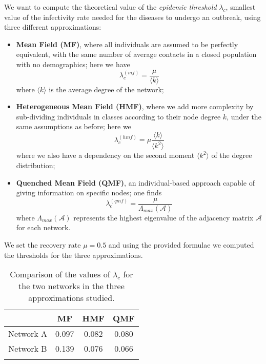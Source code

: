 \documentclass[a4paper,11pt]{article}
\begin{document}
We want to compute the theoretical value of the \emph{epidemic threshold} $\lambda_c$, smallest value of the infectivity rate needed for the diseases to undergo an outbreak, using three different approximations:
\begin{itemize}

    \item \textbf{Mean Field (MF)}, 
    where all individuals are assumed to be perfectly equivalent, with the same number of average contacts in a closed population with no demographics; here we have
        \begin{equation}
            \lambda_c^{(mf)} = \frac{\mu}{\langle k \rangle}
            \label{eq:mf_sis}
        \end{equation}
    where $\langle k \rangle$ is the average degree of the network;
    
    
    \item \textbf{Heterogeneous Mean Field (HMF)}, 
    where we add more complexity by sub-dividing individuals in classes according to their node degree $k$, under the same assumptions as before; here we
        \begin{equation}
            \lambda_c^{(hmf)} = \mu \frac{\langle k \rangle}{\langle k^2 \rangle}
        \end{equation}
    where we also have a dependency on the second moment $\langle k^2 \rangle$ of the degree distribution;
    
    
    \item \textbf{Quenched Mean Field (QMF)}, 
    an individual-based approach capable of giving information on specific nodes; one finds
        \begin{equation}
            \lambda_c^{(qmf)} = \frac{\mu}{\Lambda_{max}(\mathcal{A})}
        \end{equation}
    where $\Lambda_{max}(\mathcal{A})$ represents the highest eigenvalue of the adjacency matrix $\mathcal{A}$ for each network.
\end{itemize}


We set the recovery rate $\mu=0.5$ and using the provided formulae we computed the thresholds for the three approximations. 
\begin{longtable}[htp]{c|ccc}
\centering
& \textbf{MF} & \textbf{HMF} & \textbf{QMF}   \\
\midrule
Network A   & 0.097 & 0.082 & 0.080  \\
\midrule
Network B   & 0.139 & 0.076 & 0.066 \\
\bottomrule
\bottomrule
\caption{Comparison of the values of $\lambda_c$ for the two networks in the three approximations studied.}
\label{tab:graph_parameters}
\end{longtable}
\end{document}
